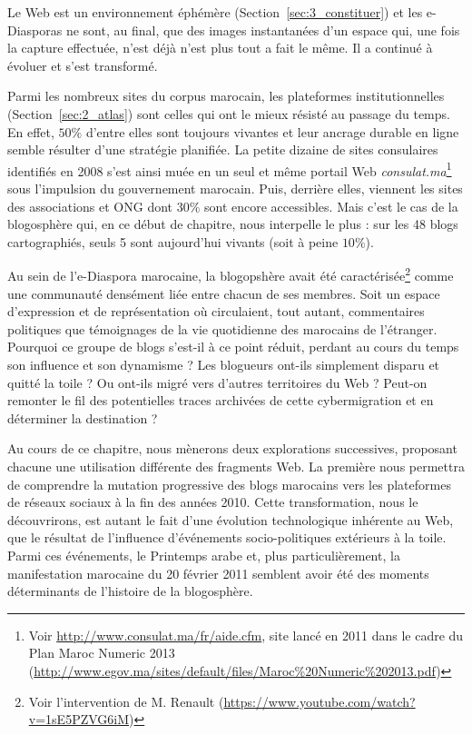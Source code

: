 \documentclass[symmetric,justified,marginals=raggedouter]{tufte-book}
\begin{document}
Le Web est un environnement éphémère (Section~\ref{sec:3_constituer}) et les e-Diaspo\-ras ne sont, au final, que des images instantanées d'un espace qui, une fois la capture effectuée, n'est déjà n'est plus tout a fait le même. Il a continué à évoluer et s'est transformé. 

Parmi les nombreux sites du corpus marocain, les plateformes institutionnelles (Section~\ref{sec:2_atlas}) sont celles qui ont le mieux résisté au passage du temps. En effet, $50\%$ d'entre elles sont toujours vivantes et leur ancrage durable en ligne semble résulter d'une stratégie planifiée. La petite dizaine de sites consulaires identifiés en 2008 s'est ainsi muée en un seul et même portail Web \textit{consulat.ma}\footnote{\RaggedOuter Voir \url{http://www.consulat.ma/fr/aide.cfm}, site lancé en 2011 dans le cadre du Plan Maroc Numeric 2013 (\url{http://www.egov.ma/sites/default/files/Maroc\%20Numeric\%202013.pdf})} sous l'impulsion du gouvernement marocain. Puis, derrière elles, viennent les sites des associations et ONG dont $30\%$ sont encore accessibles. Mais c'est le cas de la blogosphère qui, en ce début de chapitre, nous interpelle le plus : sur les 48 blogs cartographiés, seuls 5 sont aujourd'hui vivants (soit à peine $10\%$).

Au sein de l'e-Diaspora marocaine, la blogopshère avait été caractérisée\footnote{\RaggedOuter Voir l'intervention de M. Renault (\url{https://www.youtube.com/watch?v=1sE5PZVG6iM})} comme une communauté densément liée entre chacun de ses membres. Soit un espace d'expression et de représentation où circulaient, tout autant, commentaires politiques que témoignages de la vie quotidienne des marocains de l'étranger. Pourquoi ce groupe de blogs s'est-il à ce point réduit, perdant au cours du temps son influence et son dynamisme ? Les blogueurs ont-ils simplement disparu et quitté la toile ? Ou ont-ils migré vers d'autres territoires du Web ? Peut-on remonter le fil des potentielles traces archivées de cette cybermigration et en déterminer la destination ?

Au cours de ce chapitre, nous mènerons deux explorations successives, proposant chacune une utilisation différente des fragments Web. La première nous permettra de comprendre la mutation progressive des blogs marocains vers les plateformes de réseaux sociaux à la fin des années 2010. Cette transformation, nous le découvrirons, est autant le fait d'une évolution technologique inhérente au Web, que le résultat de l'influence d'événements socio-politiques extérieurs à la toile. Parmi ces événements, le Printemps arabe et, plus particulièrement, la manifestation marocaine du 20 février 2011 semblent avoir été des moments déterminants de l'histoire de la blogosphère. 
\end{document}
